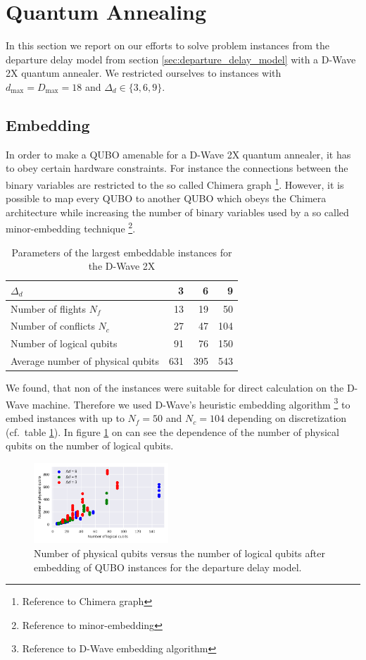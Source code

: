 \section{Quantum Annealing}
In this section we report on our efforts to solve problem instances from the departure delay model from section \ref{sec:departure_delay_model} with a D-Wave 2X quantum annealer.
We restricted ourselves to instances with $d_\text{max}=D_\text{max}=18$ and $\Delta_d \in \{3, 6, 9\}$.
\subsection{Embedding}
In order to make a QUBO amenable for a D-Wave 2X quantum annealer, it has to obey certain hardware constraints.
For instance the connections between the binary variables are restricted to the so called Chimera graph \footnote{Reference to Chimera graph}.
However, it is possible to map every QUBO to another QUBO which obeys the Chimera architecture while increasing the number of binary variables used by a so called minor-embedding technique \footnote{Reference to minor-embedding}. 

\begin{table}[htpb]
    \begin{tabular}{lrrr}
    \toprule
    $\Delta_d$ &    3 &    6 &    9 \\
    \midrule
    Number of flights $N_f$   &   13 &   19 &   50 \\
    Number of conflicts $N_c$ &   27 &   47 &  104 \\
    Number of logical qubits  &   91 &   76 &  150 \\
    Average number of physical qubits &  631 &  395 &  543 \\
    \bottomrule
    \end{tabular}
    \caption{Parameters of the largest embeddable instances for the D-Wave 2X}
    \label{tab:embedding}
\end{table}

We found, that non of the instances were suitable for direct calculation on the D-Wave machine.
Therefore we used D-Wave's heuristic embedding algorithm \footnote{Reference to D-Wave embedding algorithm} to embed instances with up to $N_f=50$ and $N_c=104$ depending on discretization (cf.\ table \ref{tab:embedding}).
In figure \ref{fig:number_of_physical_qubits} on can see the dependence of the number of physical qubits on the number of logical qubits.


\begin{figure}[htpb]
    \centering
    \includegraphics[width=0.45\textwidth]{./pics/physicalVsLogicalNumberOfQubits.pdf}
    \caption{Number of physical qubits versus the number of logical qubits after embedding of QUBO instances for the departure delay model.}
    \label{fig:number_of_physical_qubits}
\end{figure}




